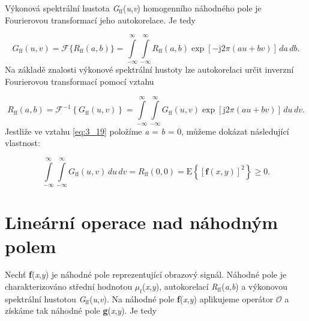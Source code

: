Výkonová spektrální hustota \textit{G}$_{\mathrm{ff}}$(\textit{u},\textit{v}) homogenního náhodného pole je Fourierovou transformací jeho autokorelace. Je tedy

\begin{equation} \label{eq:3_18}
    G_{\mathrm{ff}}(u, v) = \mathscr{F} \{ R_{\mathrm{ff}}(a, b) \} = \int\limits_{-\infty}^{\infty} \int\limits_{-\infty}^{\infty} R_{\mathrm{ff}}(a, b) \exp \left[ - \mathrm{j} 2 \pi \left(au + bv \right) \right] \,da\,db.
\end{equation}
Na základě znalosti výkonové spektrální hustoty lze autokorelaci určit inverzní Fourierovou transformací pomocí vztahu

\begin{equation} \label{eq:3_19}
    R_{\mathrm{ff}}(a, b) = \mathscr{F}^{-1} \left\{ G_{\mathrm{ff}}(u, v) \right\} = \int\limits_{-\infty}^{\infty} \int\limits_{-\infty}^{\infty} G_{\mathrm{ff}}(u, v) \exp \left[ \mathrm{j} 2 \pi \left(au + bv \right) \right] \,du\,dv.
\end{equation}
Jestliže ve vztahu \eqref{eq:3_19} položíme \textit{a} = \textit{b} = 0, můžeme dokázat následující vlastnost:

\begin{equation} \label{eq:3_20}
    \int\limits_{-\infty}^{\infty} \int\limits_{-\infty}^{\infty} G_{\mathrm{ff}}(u, v)\,du\,dv = R_{\mathrm{ff}}(0, 0) = \mathrm{E} \left\{ \left[ \mathbf{f} (x, y) \right]^2 \right\} \geq 0.
\end{equation}

\section*{Lineární operace nad náhodným polem}

Nechť \textbf{f}(\textit{x},\textit{y}) je náhodné pole reprezentující obrazový signál. Náhodné pole je charakterizováno střední hodnotou $\mu_\mathrm{f}$(\textit{x},\textit{y}), autokorelací \textit{R}$_{\mathrm{ff}}$(\textit{a},\textit{b}) a výkonovou spektrální hustotou \textit{G}$_{\mathrm{ff}}$(\textit{u},\textit{v}). Na náhodné pole \textbf{f}(\textit{x},\textit{y}) aplikujeme operátor $\mathscr{O}$ a získáme tak náhodné pole \textbf{g}(\textit{x},\textit{y}). Je tedy

